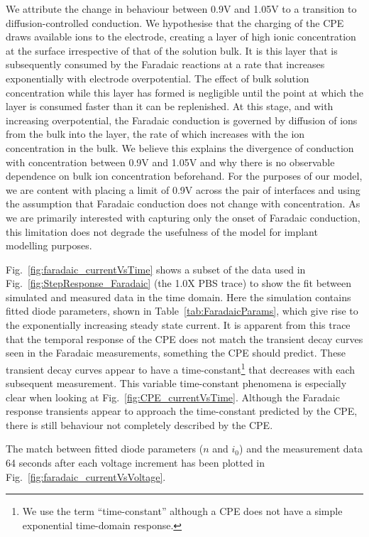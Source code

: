 \documentclass[journal, a4paper]{IEEEtran}
\begin{document}
We attribute the change in behaviour between 0.9\thinspace V and 1.05\thinspace V to a transition to diffusion-controlled conduction.
We hypothesise that the charging of the CPE draws available ions to the electrode, creating a layer of high ionic concentration at the surface irrespective of that of the solution bulk. It is this layer that is subsequently consumed by the Faradaic reactions at a rate that increases exponentially with electrode overpotential.  The effect of bulk solution concentration while this layer has formed is negligible until the point at which the layer is consumed faster than it can be replenished. At this stage, and with increasing overpotential, the Faradaic conduction is governed by diffusion of ions from the bulk into the layer, the rate of which increases with the ion concentration in the bulk. We believe this explains the divergence of conduction with concentration between 0.9\thinspace V and 1.05\thinspace V and why there is no observable dependence on bulk ion concentration beforehand.
For the purposes of our model, we are content with placing a limit of 0.9\thinspace V across the pair of interfaces and using the assumption that Faradaic conduction does not change with concentration. As we are primarily interested with capturing only the onset of Faradaic conduction, this limitation does not degrade the usefulness of the model for implant modelling purposes.


    Fig.~\ref{fig:faradaic_currentVsTime} shows a subset of the data used in Fig.~\ref{fig:StepResponse_Faradaic} (the 1.0X PBS trace) to show the fit between simulated and measured data in the time domain. Here the simulation contains fitted diode parameters, shown in Table~\ref{tab:FaradaicParams}, which give rise to the exponentially increasing steady state current.
It is apparent from this trace that the temporal response of the CPE does not match the transient decay curves seen in the Faradaic measurements, something the CPE should predict. These transient decay curves appear to have a time-constant\footnote{We use the term ``time-constant'' although a CPE does not have a simple exponential time-domain response.} that decreases with each subsequent measurement. This variable time-constant phenomena is especially clear when looking at Fig.~\ref{fig:CPE_currentVsTime}. Although the Faradaic response transients appear to approach the time-constant predicted by the CPE, there is still behaviour not completely described by the CPE.

The match between fitted diode parameters ($n$ and $i_{0}$) and the measurement data 64 seconds after each voltage increment has been plotted in Fig.~\ref{fig:faradaic_currentVsVoltage}.
\end{document}
